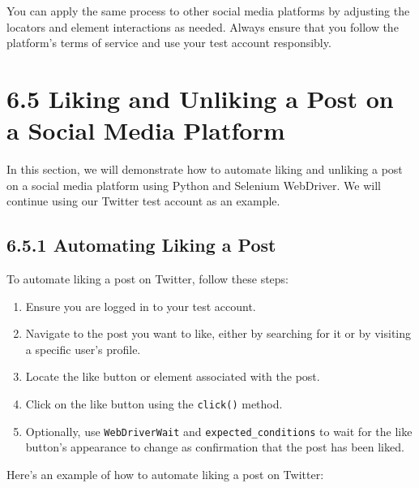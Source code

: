 \documentclass[
  paper=a4,
  ,captions=tableheading
]{scrartcl}
\providecommand{\tightlist}{%
  \setlength{\itemsep}{0pt}\setlength{\parskip}{0pt}}
\begin{document}
You can apply the same process to other social media platforms by
adjusting the locators and element interactions as needed. Always ensure
that you follow the platform's terms of service and use your test
account responsibly.

\hypertarget{liking-and-unliking-a-post-on-a-social-media-platform}{%
\section{6.5 Liking and Unliking a Post on a Social Media
Platform}\label{liking-and-unliking-a-post-on-a-social-media-platform}}

In this section, we will demonstrate how to automate liking and unliking
a post on a social media platform using Python and Selenium WebDriver.
We will continue using our Twitter test account as an example.

\hypertarget{automating-liking-a-post}{%
\subsection{6.5.1 Automating Liking a
Post}\label{automating-liking-a-post}}

To automate liking a post on Twitter, follow these steps:

\begin{enumerate}
\def\labelenumi{\arabic{enumi}.}
\tightlist
\item
  Ensure you are logged in to your test account.
\item
  Navigate to the post you want to like, either by searching for it or
  by visiting a specific user's profile.
\item
  Locate the like button or element associated with the post.
\item
  Click on the like button using the \texttt{click()} method.
\item
  Optionally, use \texttt{WebDriverWait} and
  \texttt{expected\_conditions} to wait for the like button's appearance
  to change as confirmation that the post has been liked.
\end{enumerate}

Here's an example of how to automate liking a post on Twitter:
\end{document}
